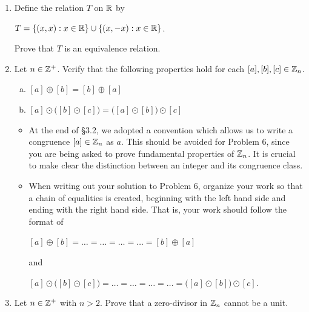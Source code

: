 \documentclass[11pt,fleqn,dvipsnames,usenames]{article}
\begin{document}
\begin{enumerate}

\item Define the relation $T$ on $\mathbb{R}$ by
\begin{center}
$T = \left\{(x,x): x\in\mathbb{R}\right\}\cup \left\{(x,-x): x\in\mathbb{R}\right\}$.
\end{center}
Prove that $T$ is an equivalence relation.

\item Let $n\in\mathbb{Z}^{+}$.  Verify that the following properties hold for each $[a],[b],[c]\in\mathbb{Z}_n$.
\vsmsp

\begin{enumerate}[(a)]
\item $[a] \oplus [b] = [b]\oplus [a]$
\item $[a] \odot \big([b] \odot [c]\big) = \big([a] \odot [b]\big)\odot [c]$
\end{enumerate}

\notes
\begin{itemize}
\item At the end of \S3.2, we adopted a convention which allows us to write a congruence $[a]\in\mathbb{Z}_n$ as $a$.  This should be avoided for Problem 6, since you are being asked to prove fundamental properties of $\mathbb{Z}_n$.  It is crucial to make clear the distinction between an integer and its congruence class.
\item When writing out your solution to Problem 6, organize your work so that a chain of equalities is created, beginning with the left hand side and ending with the right hand side.  That is, your work should follow the format of
\begin{center}
$[a]\oplus [b] = \ldots = \ldots = \ldots = \ldots = [b] \oplus [a]$
\end{center}
and
\begin{center}
$[a] \odot \big([b] \odot [c]\big) = \ldots = \ldots = \ldots = \ldots = \big([a] \odot [b]\big)\odot [c]$.
\end{center}
\end{itemize}
\item Let $n\in\mathbb{Z}^+$ with $n > 2$.  Prove that a zero-divisor in $\mathbb{Z}_n$ cannot be a unit.

\end{enumerate}
\end{document}
